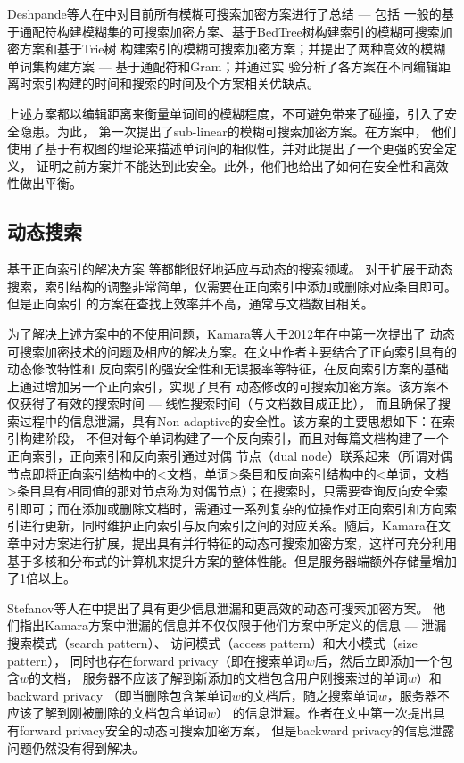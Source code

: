 Deshpande等人在\cite{balamuralikrishna2013fuzzy}中对目前所有模糊可搜索加密方案进行了总结 --- 包括
一般的基于通配符构建模糊集的可搜索加密方案、基于BedTree树构建索引的模糊可搜索加密方案和基于Trie树
构建索引的模糊可搜索加密方案；并提出了两种高效的模糊单词集构建方案 --- 基于通配符和Gram；并通过实
验分析了各方案在不同编辑距离时索引构建的时间和搜索的时间及个方案相关优缺点。

上述方案都以编辑距离来衡量单词间的模糊程度，不可避免带来了碰撞，引入了安全隐患。为此，
\cite{boldyreva2014efficient}第一次提出了sub-linear的模糊可搜索加密方案。在方案中，
他们使用了基于有权图的理论来描述单词间的相似性，并对此提出了一个更强的安全定义，
证明之前方案并不能达到此安全。此外，他们也给出了如何在安全性和高效性做出平衡。

\subsection{动态搜索}
\label{sec:search_symm_symm_dynamic}

基于正向索引的解决方案\cite{goh2003secure} \cite{chang2005privacy}等都能很好地适应与动态的搜索领域。
对于扩展于动态搜索，索引结构的调整非常简单，仅需要在正向索引中添加或删除对应条目即可。但是正向索引
的方案在查找上效率并不高，通常与文档数目相关。

为了解决上述方案中的不使用问题，Kamara等人于2012年在\cite{kamara2012dynamic}中第一次提出了
动态可搜索加密技术的问题及相应的解决方案。在文中作者主要结合了正向索引具有的动态修改特性和
反向索引的强安全性和无误报率等特征，在反向索引方案的基础上通过增加另一个正向索引，实现了具有
动态修改的可搜索加密方案。该方案不仅获得了有效的搜索时间 --- 线性搜索时间（与文档数目成正比），
而且确保了搜索过程中的信息泄漏，具有Non-adaptive的安全性。该方案的主要思想如下：在索引构建阶段，
不但对每个单词构建了一个反向索引，而且对每篇文档构建了一个正向索引，正向索引和反向索引通过对偶
节点（dual node）联系起来（所谓对偶节点即将正向索引结构中的<文档，单词>条目和反向索引结构中的<单词，文档>条目具有相同值的那对节点称为对偶节点）；在搜索时，只需要查询反向安全索引即可；而在添加或删除文档时，需通过一系列复杂的位操作对正向索引和方向索引进行更新，同时维护正向索引与反向索引之间的对应关系。随后，Kamara在文章\cite{kamara2013parallel}中对\cite{kamara2012dynamic}方案进行扩展，提出具有并行特征的动态可搜索加密方案，这样可充分利用基于多核和分布式的计算机来提升方案的整体性能。但是服务器端额外存储量增加了1倍以上。

Stefanov等人在\cite{stefanov2013practical}中提出了具有更少信息泄漏和更高效的动态可搜索加密方案。
他们指出Kamara方案中泄漏的信息并不仅仅限于他们方案中所定义的信息 ---
泄漏搜索模式（search pattern）\cite{liu2014search}、
访问模式（access pattern）\cite{islam2012access}和大小模式（size pattern），
同时也存在forward privacy（即在搜索单词$w$后，然后立即添加一个包含$w$的文档，
服务器不应该了解到新添加的文档包含用户刚搜索过的单词$w$）和backward privacy
（即当删除包含某单词$w$的文档后，随之搜索单词$w$，服务器不应该了解到刚被删除的文档包含单词$w$）
的信息泄漏。作者在文中第一次提出具有forward privacy安全的动态可搜索加密方案，
但是backward privacy的信息泄露问题仍然没有得到解决。


